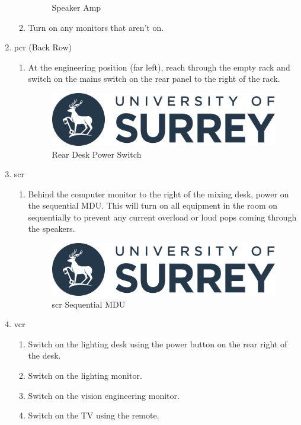 \documentclass{report}
\begin{document}
\begin{enumerate}
\begin{enumerate}
\begin{figure}[h]
                \caption{Speaker Amp}
              \end{figure}
              \item Turn on any monitors that aren't on.
          \end{enumerate}
    \item \gls{pcr} (Back Row)
          \begin{enumerate}
            \item At the engineering position (far left), reach through the empty rack and switch on the mains switch on the rear panel to the right of the rack.
            \begin{figure}[h]
                \centering
                \includegraphics[width=.5\linewidth]{uos-logo.png}
                \caption{Rear Desk Power Switch}
              \end{figure}
          \end{enumerate}

    \item \gls{scr}
    \begin{enumerate}
        \item Behind the computer monitor to the right of the mixing desk, power on the sequential MDU. This will turn on all equipment in the room on sequentially to prevent any current overload or loud pops coming through the speakers.
        \begin{figure}[h]
            \centering
            \includegraphics[width=.5\linewidth]{uos-logo.png}
            \caption{\gls{scr} Sequential MDU}
          \end{figure}
    \end{enumerate}
\item \gls{vcr}
\begin{enumerate}
    \item Switch on the lighting desk using the power button on the rear right of the desk.
    \item Switch on the lighting monitor.
    \item Switch on the vision engineering monitor.
    \item Switch on the TV using the remote.
\end{enumerate}
\end{enumerate}
\end{document}
